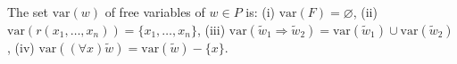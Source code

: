 The set $\text{var}(w)$ of free variables of $w \in P$ is: (i) $\text{var}(F)=\varnothing$, (ii) $\text{var}(r(x_1,\ldots,x_n))=\{x_1,\ldots,x_n\}$, (iii) $\text{var}(\tilde{w}_1 \Rightarrow \tilde{w}_2)=\text{var}(\tilde{w}_1) \cup \text{var}(\tilde{w}_2)$, (iv) $\text{var}((\forall x)\tilde{w})=\text{var}(\tilde{w})-\{x\}$.
